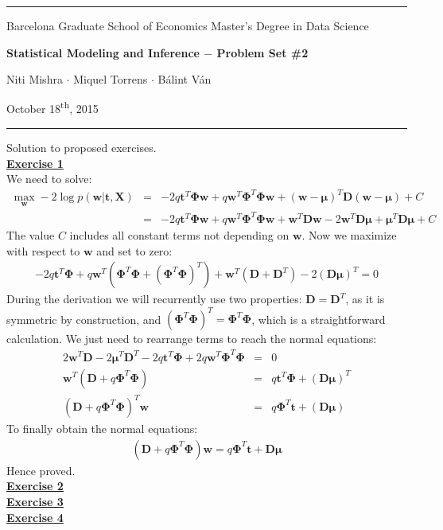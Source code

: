 \documentclass[a4paper, 11pt]{article}
\newcommand{\header}[4]{
	\begin{center}
		\rule{\linewidth}{0.5pt}
		
		{\small{#1}}
      
        \vspace{0.2in}
        
		{\large{#2}}
		
        \vspace{0.2in}
        
		{\small{#3}}
		
		\vspace{0.15in}
		
		{#4}
		
		\vspace{-0.1in}
		\rule{\linewidth}{0.6pt}
	\end{center}
}
\begin{document}
 
\header{\sc Barcelona Graduate School of Economics \hfill Master's Degree in Data Science}{\bf Statistical Modeling and Inference $-$ Problem Set \#2}{\sc Niti Mishra $\cdot$ Miquel Torrens $\cdot$ B\'alint V\'an}{October 18\textsuperscript{th}, 2015}
Solution to proposed exercises.\\
\newline \textbf{\underline{Exercise 1}}\\
\newline We need to solve:
\begin{eqnarray}
\max_{\mathbf{w}} -2 \log p(\mathbf{w | t, X}) &=&  -2q \mathbf{t}^T \mathbf{\Phi w} + q \mathbf{w}^T \mathbf{\Phi}^T \mathbf{\Phi w} + (\mathbf{w - \mu})^T \mathbf{D} (\mathbf{w - \mu}) + C \nonumber \\
&=&  -2q \mathbf{t}^T \mathbf{\Phi w} + q \mathbf{w}^T \mathbf{\Phi}^T \mathbf{\Phi w} + \mathbf{w}^T \mathbf{D w} - 2 \mathbf{w}^T \mathbf{D} \mathbf{\mu} + \mathbf{\mu}^T \mathbf{D \mu} + C \nonumber
\end{eqnarray}
The value $C$ includes all constant terms not depending on $\mathbf{w}$. Now we maximize with respect to $\mathbf{w}$ and set to zero:
\begin{eqnarray}
-2q \mathbf{t}^T \mathbf{\Phi} + q \mathbf{w}^T \left(\mathbf{\Phi}^T \mathbf{\Phi} + \left( \mathbf{\Phi}^T \mathbf{\Phi} \right)^T \right) + \mathbf{w}^T \left( \mathbf{D} + \mathbf{D}^T \right) - 2 \left( \mathbf{D} \mathbf{\mu} \right)^T = 0 \nonumber
\end{eqnarray}
During the derivation we will recurrently use two properties: $\mathbf{D} = \mathbf{D}^T$, as it is symmetric by construction, and $\left( \mathbf{\Phi}^T \mathbf{\Phi} \right)^T = \mathbf{\Phi}^T \mathbf{\Phi}$, which is a straightforward calculation. We just need to rearrange terms to reach the normal equations:
\begin{eqnarray}
2 \mathbf{w}^T\mathbf{D} -2 \mathbf{\mu}^T \mathbf{D}^T -2 q \mathbf{t}^T \mathbf{\Phi} + 2q\mathbf{w}^T \mathbf{\Phi}^T \mathbf{\Phi} &=& 0 \nonumber \\
\mathbf{w}^T \left( \mathbf{D} + q \mathbf{\Phi}^T \mathbf{\Phi} \right) &=& q\mathbf{t}^T \mathbf{\Phi} + \left( \mathbf{D\mu} \right)^T  \nonumber \\
\left( \mathbf{D} + q \mathbf{\Phi}^T \mathbf{\Phi} \right)^T \mathbf{w} &=& q\mathbf{\Phi}^T \mathbf{t} + \left( \mathbf{D\mu} \right) \nonumber
\end{eqnarray}
To finally obtain the normal equations:
\begin{eqnarray}
\left( \mathbf{D} + q \mathbf{\Phi}^T \mathbf{\Phi} \right) \mathbf{w} = q\mathbf{\Phi}^T \mathbf{t} + \mathbf{D\mu} \nonumber
\end{eqnarray}
Hence proved.\\
\newline \textbf{\underline{Exercise 2}}\\
\newline \textbf{\underline{Exercise 3}}\\
\newline \textbf{\underline{Exercise 4}}\\
\end{document}
